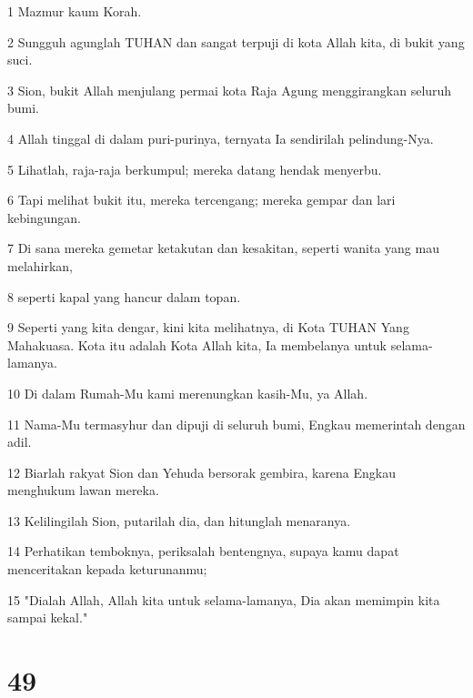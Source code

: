 \par 1 Mazmur kaum Korah.
\par 2 Sungguh agunglah TUHAN dan sangat terpuji di kota Allah kita, di bukit yang suci.
\par 3 Sion, bukit Allah menjulang permai kota Raja Agung menggirangkan seluruh bumi.
\par 4 Allah tinggal di dalam puri-purinya, ternyata Ia sendirilah pelindung-Nya.
\par 5 Lihatlah, raja-raja berkumpul; mereka datang hendak menyerbu.
\par 6 Tapi melihat bukit itu, mereka tercengang; mereka gempar dan lari kebingungan.
\par 7 Di sana mereka gemetar ketakutan dan kesakitan, seperti wanita yang mau melahirkan,
\par 8 seperti kapal yang hancur dalam topan.
\par 9 Seperti yang kita dengar, kini kita melihatnya, di Kota TUHAN Yang Mahakuasa. Kota itu adalah Kota Allah kita, Ia membelanya untuk selama-lamanya.
\par 10 Di dalam Rumah-Mu kami merenungkan kasih-Mu, ya Allah.
\par 11 Nama-Mu termasyhur dan dipuji di seluruh bumi, Engkau memerintah dengan adil.
\par 12 Biarlah rakyat Sion dan Yehuda bersorak gembira, karena Engkau menghukum lawan mereka.
\par 13 Kelilingilah Sion, putarilah dia, dan hitunglah menaranya.
\par 14 Perhatikan temboknya, periksalah bentengnya, supaya kamu dapat menceritakan kepada keturunanmu;
\par 15 "Dialah Allah, Allah kita untuk selama-lamanya, Dia akan memimpin kita sampai kekal."

\chapter{49}

